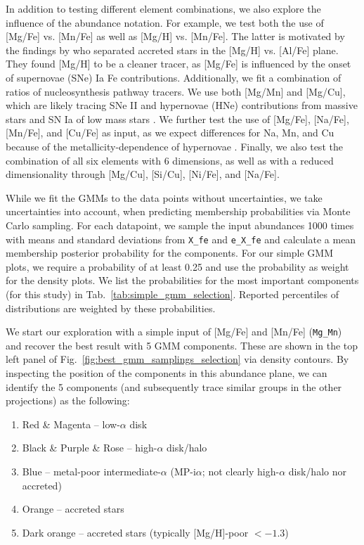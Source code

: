 \documentclass[fleqn,usenatbib]{mnras}
\begin{document}
In addition to testing different element combinations, we also explore the influence of the abundance notation. For example, we test both the use of [Mg/Fe] vs. [Mn/Fe] as well as [Mg/H] vs. [Mn/Fe]. The latter is motivated by the findings by \citet{Feuillet2021} who separated accreted stars in the [Mg/H] vs. [Al/Fe] plane. They found [Mg/H] to be a cleaner tracer, as [Mg/Fe] is influenced by the onset of supernovae (SNe) Ia Fe contributions. Additionally, we fit a combination of ratios of nucleosynthesis pathway tracers. We use both [Mg/Mn] and [Mg/Cu], which are likely tracing SNe II and hypernovae (HNe) contributions from massive stars and SN Ia of low mass stars \citep{Kobayashi2020}. We further test the use of [Mg/Fe], [Na/Fe], [Mn/Fe], and [Cu/Fe] as input, as we expect differences for Na, Mn, and Cu because of the metallicity-dependence of hypernovae \citep{Kobayashi2020}. Finally, we also test the combination of all six elements with 6 dimensions, as well as with a reduced dimensionality through [Mg/Cu], [Si/Cu], [Ni/Fe], and [Na/Fe].

While we fit the GMMs to the data points without uncertainties, we take uncertainties into account, when predicting membership probabilities via Monte Carlo sampling. For each datapoint, we sample the input abundances 1000 times with means and standard deviations from \texttt{X\_fe} and \texttt{e\_X\_fe} and calculate a mean membership posterior probability for the components. For our simple GMM plots, we require a probability of at least 0.25 and use the probability as weight for the density plots. We list the probabilities for the most important components (for this study) in Tab.~\ref{tab:simple_gmm_selection}. Reported percentiles of distributions are weighted by these probabilities.

We start our exploration with a simple input of [Mg/Fe] and [Mn/Fe] (\texttt{Mg\_Mn}) and recover the best result with 5 GMM components. These are shown in the top left panel of Fig.~\ref{fig:best_gmm_samplings_selection} via density contours. By inspecting the position of the components in this abundance plane, we can identify the 5 components (and subsequently trace similar groups in the other projections) as the following:
\begin{enumerate}
\item Red \& Magenta -- low-$\alpha$ disk
\item Black \& Purple \& Rose -- high-$\alpha$ disk/halo
\item Blue -- metal-poor intermediate-$\alpha$ (MP-i$\alpha$; not clearly high-$\alpha$ disk/halo nor accreted)
\item Orange -- accreted stars
 \item Dark orange -- accreted stars (typically [Mg/H]-poor $< -1.3$)
\end{enumerate}
\end{document}
